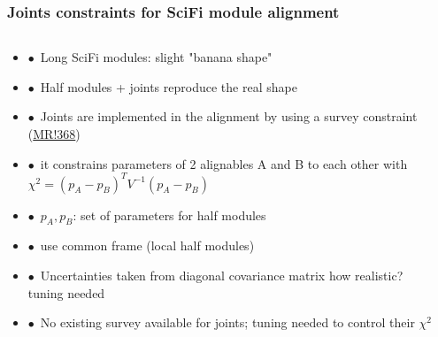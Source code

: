 \documentclass[aspectratio=1610, 12pt, xcolor=dvipsnames]{beamer}
\begin{document}
\begin{frame}\frametitle{Joints constraints for SciFi module alignment}
  \begin{columns}
    \begin{column}[c]{0.48\textwidth}
      \begin{itemize}
        \setlength\itemsep{0em}
        \item $\bullet$\, Long SciFi modules: slight "banana shape"
        \item $\bullet$\, Half modules + joints reproduce the real shape
        \item $\bullet$\, Joints are implemented in the alignment by using a survey constraint (\href{https://gitlab.cern.ch/lhcb/Alignment/-/merge_requests/368}{MR!368})
        \item $\bullet$\, it constrains parameters of 2 alignables A and B to each other with $\chi^2 = \left( p_A - p_B \right)^T V^{-1} \left( p_A - p_B \right)$
        \item $\bullet$\, $p_A,p_B$: set of parameters for half modules
        \item $\bullet$\, use common frame (local half modules)
        \item $\bullet$\, Uncertainties taken from diagonal covariance matrix \to how realistic? \to tuning needed
        \item $\bullet$\, No existing survey available for joints; tuning needed to control their $\chi^2$
      \end{itemize}
    \end{column}
      \begin{column}[c]{0.48\textwidth}
        
      \end{column}
  \end{columns}
\end{frame}
\end{document}
